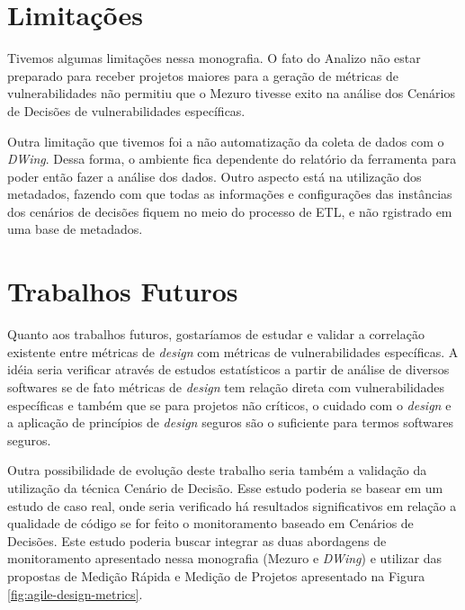 \section{Limitações}

Tivemos algumas limitações nessa monografia.
O fato do Analizo não estar preparado para receber projetos maiores para a geração de métricas de vulnerabilidades não permitiu que o Mezuro tivesse exito na análise dos Cenários de Decisões de vulnerabilidades específicas.


Outra limitação que tivemos foi a não automatização da coleta de dados com o \emph{DWing}. Dessa forma, o ambiente fica dependente do relatório da ferramenta para poder então fazer a análise dos dados. Outro aspecto está na utilização dos metadados, fazendo com que todas as informações e configurações das instâncias dos cenários de decisões fiquem no meio do processo de ETL, e não rgistrado em uma base de metadados.


\section{Trabalhos Futuros}

Quanto aos trabalhos futuros, gostaríamos de estudar e validar a correlação existente entre métricas de \emph{design} com métricas de vulnerabilidades específicas. A idéia seria verificar através de estudos estatísticos a partir de análise de diversos softwares se de fato métricas de \emph{design} tem relação direta com vulnerabilidades específicas e também que se para projetos não críticos, o cuidado com o \emph{design} e a aplicação de princípios de \emph{design} seguros são o suficiente para termos softwares seguros. 

Outra possibilidade de evolução deste trabalho seria também a validação da utilização da técnica Cenário de Decisão. Esse estudo poderia se basear em um estudo de caso real, onde seria verificado há resultados significativos em relação a qualidade de código se for feito o monitoramento baseado em Cenários de Decisões. Este estudo poderia buscar integrar as duas abordagens de monitoramento apresentado nessa monografia (Mezuro e \emph{DWing}) e utilizar das propostas de Medição Rápida e Medição de Projetos apresentado na Figura \ref{fig:agile-design-metrics}.

%

